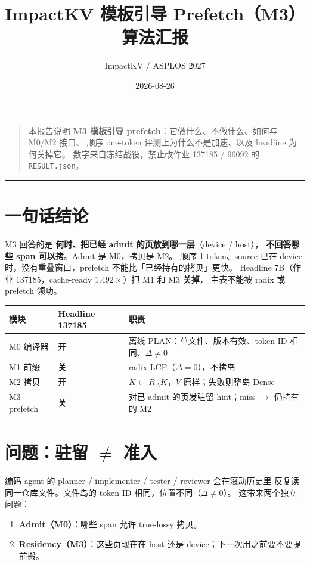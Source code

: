\documentclass[UTF8,a4paper,11pt,fontset=fandol]{ctexart}
\title{\textbf{ImpactKV 模板引导 Prefetch（M3）算法汇报}}
\author{ImpactKV / ASPLOS 2027}
\date{2026-08-26}
\begin{document}
\maketitle
\begin{quote}\small
本报告说明 \textbf{M3 模板引导 prefetch}：它做什么、不做什么、如何与 M0/M2 接口、
顺序 one-token 评测上为什么不是加速、以及 headline 为何关掉它。
数字来自冻结战役，禁止改作业 137185 / 96092 的 \texttt{RESULT.json}。
\end{quote}

\tableofcontents
\vspace{0.6em}
\noindent\rule{\linewidth}{0.4pt}

\section{一句话结论}

M3 回答的是 \textbf{何时、把已经 admit 的页放到哪一层}（device / host），
\textbf{不回答哪些 span 可以拷}。Admit 是 M0，拷贝是 M2。
顺序 1-token、source 已在 device 时，没有重叠窗口，prefetch 不能比「已经持有的拷贝」更快。
Headline 7B（作业 137185，cache-ready $1.492\times$）把 M1 和 M3 \textbf{关掉}，
主表不能被 radix 或 prefetch 领功。

\begin{center}
\small
\begin{tabular}{llp{}}
\toprule
\textbf{模块} & \textbf{Headline 137185} & \textbf{职责} \\
\midrule
M0 编译器 & 开 & 离线 PLAN：单文件、版本有效、token-ID 相同、$\Delta\neq 0$ \\
M1 前缀 & \textbf{关} & radix LCP（$\Delta=0$），不拷岛 \\
M2 拷贝 & 开 & $K\leftarrow R_\Delta K$，$V$ 原样；失败则整岛 Dense \\
M3 prefetch & \textbf{关} & 对已 admit 的页发驻留 hint；miss $\to$ 仍持有的 M2 \\
\bottomrule
\end{tabular}
\end{center}

\section{问题：驻留 $\neq$ 准入}

编码 agent 的 planner / implementer / tester / reviewer 会在滚动历史里
反复读同一仓库文件。文件岛的 token ID 相同，位置不同（$\Delta\neq 0$）。
这带来两个独立问题：

\begin{enumerate}
  \item \textbf{Admit（M0）}：哪些 span 允许 true-lossy 拷贝。
  \item \textbf{Residency（M3）}：这些页现在在 host 还是 device；下一次用之前要不要提前搬。
\end{enumerate}
\end{document}
